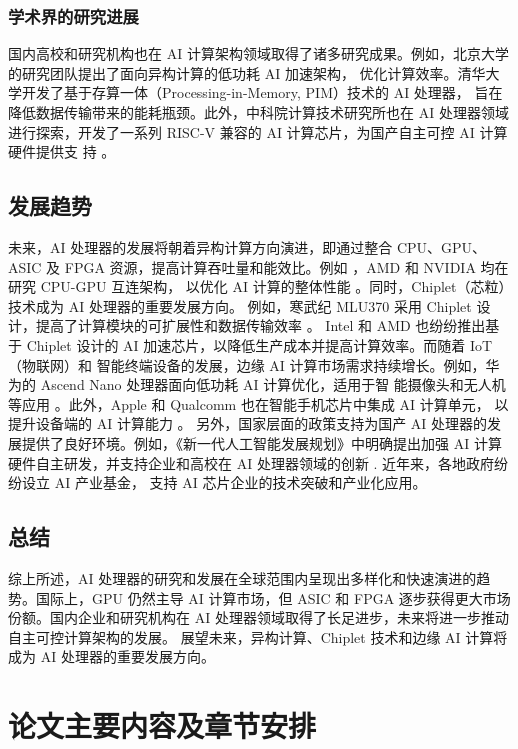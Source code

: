\subsubsection{学术界的研究进展}

国内高校和研究机构也在 AI 计算架构领域取得了诸多研究成果。例如，北京大学的研究团队提出了面向异构计算的低功耗 AI 加速架构，
优化计算效率。清华大学开发了基于存算一体（Processing-in-Memory, PIM）技术的 AI 处理器，
旨在降低数据传输带来的能耗瓶颈。此外，中科院计算技术研究所也在 AI 处理器领域进行探索，开发了一系列 RISC-V 兼容的 AI 计算芯片，为国产自主可控 AI 计算硬件提供支
持 。


\subsection{发展趋势}
未来，AI 处理器的发展将朝着异构计算方向演进，即通过整合 CPU、GPU、ASIC 及 FPGA 资源，提高计算吞吐量和能效比。例如
，AMD 和 NVIDIA 均在研究 CPU-GPU 互连架构，
以优化 AI 计算的整体性能 \cite{mishty2024chiplet}。同时，Chiplet（芯粒）技术成为 AI 处理器的重要发展方向。
例如，寒武纪 MLU370 采用 Chiplet 设计，提高了计算模块的可扩展性和数据传输效率 。
Intel 和 AMD 也纷纷推出基于 Chiplet 设计的 AI 加速芯片，以降低生产成本并提高计算效率。而随着 IoT（物联网）和
智能终端设备的发展，边缘 AI 计算市场需求持续增长。例如，华为的 Ascend Nano 处理器面向低功耗 AI 计算优化，适用于智
能摄像头和无人机等应用 。此外，Apple 和 Qualcomm 也在智能手机芯片中集成 AI 计算单元，
以提升设备端的 AI 计算能力 。
另外，国家层面的政策支持为国产 AI 处理器的发展提供了良好环境。例如，《新一代人工智能发展规划》中明确提出加强 AI 计算
硬件自主研发，并支持企业和高校在 AI 处理器领域的创新 . 近年来，各地政府纷纷设立 AI 产业基金，
支持 AI 芯片企业的技术突破和产业化应用。

\subsection{总结}

综上所述，AI 处理器的研究和发展在全球范围内呈现出多样化和快速演进的趋势。国际上，GPU 仍然主导 AI 计算市场，但 ASIC 
和 FPGA 逐步获得更大市场份额。国内企业和研究机构在 AI 处理器领域取得了长足进步，未来将进一步推动自主可控计算架构的发展。
展望未来，异构计算、Chiplet 技术和边缘 AI 计算将成为 AI 处理器的重要发展方向。



\section{论文主要内容及章节安排}

